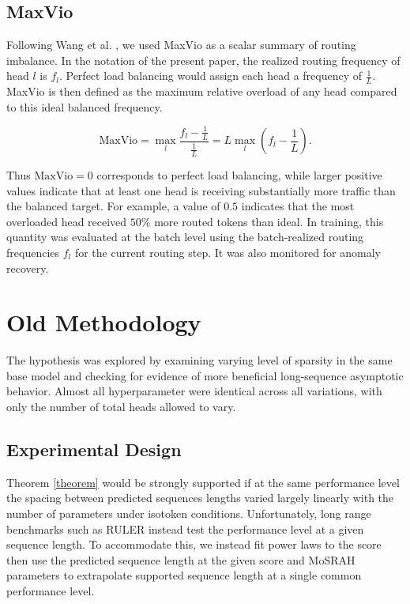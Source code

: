 \documentclass[11pt]{article}
\begin{document}
\subsection{MaxVio}
\label{app:maxvio}

Following Wang et al. \cite{wang2024auxiliarylossfree}, we used MaxVio as a scalar summary of routing imbalance. In the notation of the present paper, the realized routing frequency of head $l$ is $f_l$. Perfect load balancing would assign each head a frequency of $\frac{1}{L}$. MaxVio is then defined as the maximum relative overload of any head compared to this ideal balanced frequency.

\[
\mathrm{MaxVio}
=
\max_l
\frac{f_l - \frac{1}{L}}{\frac{1}{L}}
=
L \max_l \left( f_l - \frac{1}{L} \right).
\]

Thus $\mathrm{MaxVio}=0$ corresponds to perfect load balancing, while larger positive values indicate that at least one head is receiving substantially more traffic than the balanced target. For example, a value of $0.5$ indicates that the most overloaded head received $50\%$ more routed tokens than ideal. In training, this quantity was evaluated at the batch level using the batch-realized routing frequencies $f_l$ for the current routing step. It was also monitored for anomaly recovery.

\section{Old Methodology}

The hypothesis was explored by examining varying level of sparsity in the same base model and checking for evidence of more beneficial long-sequence asymptotic behavior. Almost all hyperparameter were identical across all variations, with only the number of total heads allowed to vary.

\subsection{Experimental Design}

Theorem \ref{theorem} would be strongly supported if at the same performance level the spacing between predicted sequences lengths varied largely linearly with the number of parameters under isotoken conditions. Unfortunately, long range benchmarks such as RULER instead test the performance level at a given sequence length. To accommodate this, we instead fit power laws to the score then use the predicted sequence length at the given score and MoSRAH parameters to extrapolate supported sequence length at a single common performance level.
\end{document}
